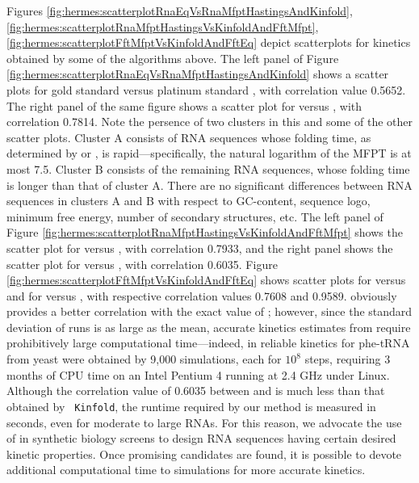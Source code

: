 Figures \ref{fig:hermes:scatterplotRnaEqVsRnaMfptHastingsAndKinfold},
\ref{fig:hermes:scatterplotRnaMfptHastingsVsKinfoldAndFftMfpt},
\ref{fig:hermes:scatterplotFftMfptVsKinfoldAndFftEq}
depict scatterplots for kinetics obtained by some of the algorithms
above. The left panel of
Figure \ref{fig:hermes:scatterplotRnaEqVsRnaMfptHastingsAndKinfold}
shows a scatter plots for gold standard \rnamfpt versus platinum
standard \rnaeq, with correlation value 0.5652. The right
panel of the same figure shows a scatter plot for \kinfold versus
\rnaeq, with correlation 0.7814. Note the persence of two
clusters in this and some of the other scatter plots. Cluster A
consists of RNA sequences whose folding time, as determined by \rnamfpt
or \rnaeq, is rapid---specifically, the natural
logarithm of the MFPT is at most 7.5. Cluster B consists of the
remaining RNA sequences, whose folding time is longer than that of
cluster A. There are no significant differences between RNA sequences
in clusters A and B with respect to GC-content, sequence logo, minimum
free energy, number of secondary structures, etc.  The left panel of
Figure \ref{fig:hermes:scatterplotRnaMfptHastingsVsKinfoldAndFftMfpt}
shows the scatter plot for \rnamfpt versus \kinfold, with
correlation 0.7933, and the right panel shows the scatter plot for
\rnamfpt versus \fftmfpt, with correlation 0.6035.
Figure \ref{fig:hermes:scatterplotFftMfptVsKinfoldAndFftEq}
shows scatter plots for \fftmfpt versus  and
for \fftmfpt versus , with respective
correlation values 0.7608 and 0.9589. \kinfold obviously provides
a better correlation with the exact value of \mfpt;
however, since the standard deviation of \kinfold runs is as
large as the mean, accurate kinetics estimates
from \kinfold require prohibitively large computational time---indeed, in
\cite{wolfingerstadler:kinetics} reliable kinetics for phe-tRNA from
yeast were obtained by 9,000 \kinfold simulations, each for $10^8$
steps, requiring 3 months of CPU time on an Intel Pentium 4 running at
2.4 GHz under Linux. Although the correlation value of 0.6035 between
\rnamfpt and \fftmfpt is much less than that obtained by {\tt
Kinfold}, the runtime required by our method \fftmfpt is measured
in seconds, even for moderate to large RNAs. For this reason, we
advocate the use of \fftmfpt in synthetic biology screens to
design RNA sequences having certain desired kinetic properties. Once
promising candidates are found, it is possible to devote additional
computational time to \kinfold simulations for more accurate
kinetics.

